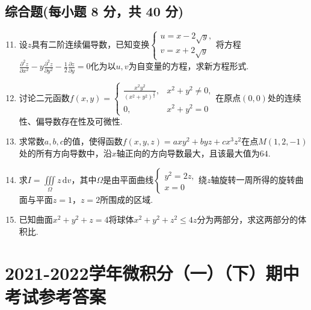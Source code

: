 \documentclass[../main.tex]{subfiles}
\begin{document}
\section{综合题(每小题 8 分，共 40 分)}
\begin{enumerate}
    \setcounter{enumi}{10}
    \item 设$z$具有二阶连续偏导数，已知变换$\begin{cases}
                  u=x-2\sqrt{y}, \\
                  v=x+2\sqrt{y}
              \end{cases}$将方程$\frac{\partial^{2} z}{\partial x^{2}}-y\frac{\partial^{2}
                  z}{\partial y^{2}}-\frac{1}{2}\frac{\partial z}{\partial y}=0$化为以$u,v$为自变量的方程，求新方程形式.
          \vspace{10em}

    \item 讨论二元函数$f(x,y)=
              \begin{cases}
                  \frac{x^2y^2}{\left(x^{2}+y^{2}\right)^{\frac{3}{2}}}, & x^{2}+y^{2}\neq 0, \\
                  0,                                                     & x^{2}+y^{2}=0
              \end{cases}$在原点$(0,0)$处的连续性、偏导数存在性及可微性.
          \vspace{11em}

    \item 求常数$a,b,c$的值，使得函数$f(x,y,z)=axy^{2}+byz+cx^{3}z^{2}$在点$M
              (1,2,-1)$处的所有方向导数中，沿$x$轴正向的方向导数最大，且该最大值为$64$.
          \vspace{11em}

    \item 求$I=\iiint\limits_{\Omega}z\,\mathrm{d}v$，其中$\Omega$是由平面曲线$\begin{cases}
                  y^{2}=2z, \\
                  x=0
              \end{cases}$绕$z$轴旋转一周所得的旋转曲面与平面$z=1$，$z=2$所围成的区域.
          \vspace{11em}

    \item 已知曲面$x^{2}+y^{2}+z=4$将球体$x^{2}+y^{2}+z^{2}\leq 4z$分为两部分，求这两部分的体积比.
          \vspace{11em}
\end{enumerate}

\chapter{2021-2022学年微积分（一）（下）期中考试参考答案}
\end{document}
